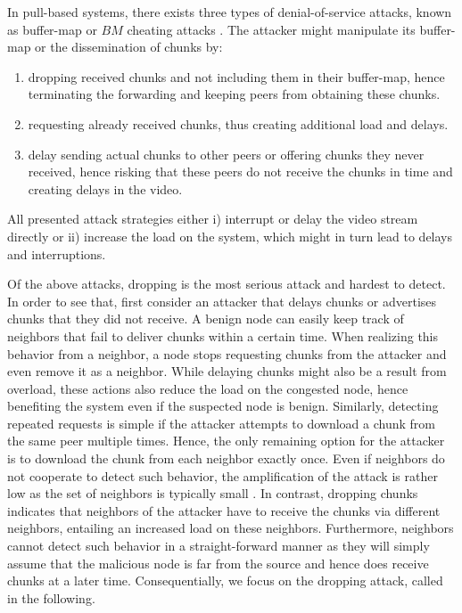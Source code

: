 In pull-based systems, there exists three types of denial-of-service attacks, known as buffer-map or $BM$ cheating attacks \cite{cheatingAnalysis}. 
The attacker might manipulate its buffer-map or the dissemination of chunks by: 
\begin{enumerate}
\item dropping received chunks and not including them in their buffer-map, hence terminating the forwarding and keeping peers from obtaining these chunks.
\item requesting already received chunks, thus creating additional load and delays.
\item delay sending actual chunks to other peers or offering chunks they never received, hence risking that these peers do not receive the chunks in time and creating delays in the video. 
\end{enumerate}
All presented attack strategies either i) interrupt or delay the video stream directly or ii) increase the load on the system, which might in turn lead to delays and interruptions. 


Of the above attacks, dropping is the most serious attack and hardest to detect.
In order to see that, first consider an attacker that delays chunks or advertises chunks that they did not receive. A benign node can easily keep track of neighbors that fail to deliver chunks within a certain time. When realizing this behavior from a neighbor, a node stops requesting chunks from the attacker and even remove it as a neighbor. While delaying chunks might also be a result from overload, these actions also reduce the load on the congested node, hence benefiting the system even if the suspected node is benign. 
Similarly, detecting repeated requests is simple if the attacker attempts to download a chunk from the same peer multiple times. Hence, the only remaining option for the attacker is to download the chunk from each neighbor exactly once. Even if neighbors do not cooperate to detect such behavior, the amplification of the attack is rather low as the set of neighbors is typically small \cite{neighborlist1,neighborlist2}. 
In contrast, dropping chunks indicates that neighbors of the attacker have to receive the chunks via different neighbors, entailing an increased  load on these neighbors. Furthermore, neighbors cannot detect such behavior in a straight-forward manner as they will simply assume that the malicious node is far from the source and hence does receive chunks at a later time. 
Consequentially, we focus on the dropping attack, called \drop in the following. 

